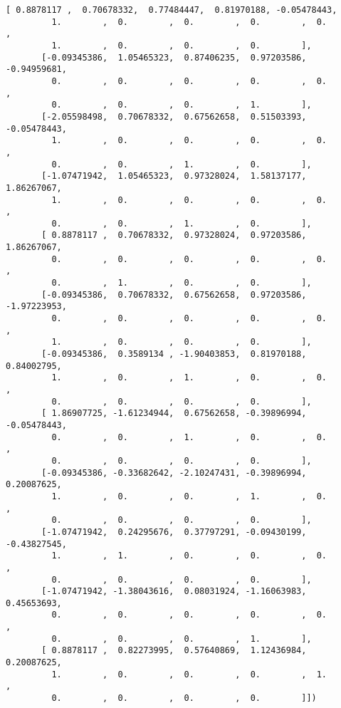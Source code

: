 \documentclass[11pt]{article}
\begin{document}
\begin{tcolorbox}[breakable, size=fbox, boxrule=.5pt, pad at break*=1mm, opacityfill=0]
\begin{Verbatim}[commandchars=\\\{\}]
       [ 0.8878117 ,  0.70678332,  0.77484447,  0.81970188, -0.05478443,
         1.        ,  0.        ,  0.        ,  0.        ,  0.        ,
         1.        ,  0.        ,  0.        ,  0.        ],
       [-0.09345386,  1.05465323,  0.87406235,  0.97203586, -0.94959681,
         0.        ,  0.        ,  0.        ,  0.        ,  0.        ,
         0.        ,  0.        ,  0.        ,  1.        ],
       [-2.05598498,  0.70678332,  0.67562658,  0.51503393, -0.05478443,
         1.        ,  0.        ,  0.        ,  0.        ,  0.        ,
         0.        ,  0.        ,  1.        ,  0.        ],
       [-1.07471942,  1.05465323,  0.97328024,  1.58137177,  1.86267067,
         1.        ,  0.        ,  0.        ,  0.        ,  0.        ,
         0.        ,  0.        ,  1.        ,  0.        ],
       [ 0.8878117 ,  0.70678332,  0.97328024,  0.97203586,  1.86267067,
         0.        ,  0.        ,  0.        ,  0.        ,  0.        ,
         0.        ,  1.        ,  0.        ,  0.        ],
       [-0.09345386,  0.70678332,  0.67562658,  0.97203586, -1.97223953,
         0.        ,  0.        ,  0.        ,  0.        ,  0.        ,
         1.        ,  0.        ,  0.        ,  0.        ],
       [-0.09345386,  0.3589134 , -1.90403853,  0.81970188,  0.84002795,
         1.        ,  0.        ,  1.        ,  0.        ,  0.        ,
         0.        ,  0.        ,  0.        ,  0.        ],
       [ 1.86907725, -1.61234944,  0.67562658, -0.39896994, -0.05478443,
         0.        ,  0.        ,  1.        ,  0.        ,  0.        ,
         0.        ,  0.        ,  0.        ,  0.        ],
       [-0.09345386, -0.33682642, -2.10247431, -0.39896994,  0.20087625,
         1.        ,  0.        ,  0.        ,  1.        ,  0.        ,
         0.        ,  0.        ,  0.        ,  0.        ],
       [-1.07471942,  0.24295676,  0.37797291, -0.09430199, -0.43827545,
         1.        ,  1.        ,  0.        ,  0.        ,  0.        ,
         0.        ,  0.        ,  0.        ,  0.        ],
       [-1.07471942, -1.38043616,  0.08031924, -1.16063983,  0.45653693,
         0.        ,  0.        ,  0.        ,  0.        ,  0.        ,
         0.        ,  0.        ,  0.        ,  1.        ],
       [ 0.8878117 ,  0.82273995,  0.57640869,  1.12436984,  0.20087625,
         1.        ,  0.        ,  0.        ,  0.        ,  1.        ,
         0.        ,  0.        ,  0.        ,  0.        ]])
\end{Verbatim}
\end{tcolorbox}
        
\end{document}
